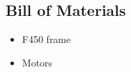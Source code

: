 








\begin{appendices}

\chapter{Bill of Materials}

\begin{itemize}
	\item F450 frame
	\item Motors
\end{itemize}

\end{appendices}

